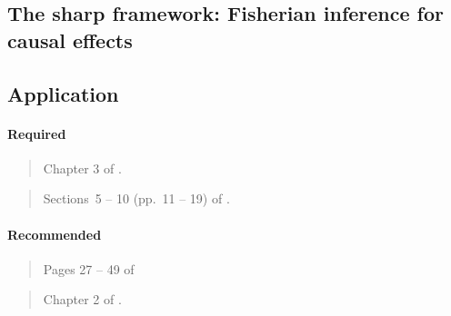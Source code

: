 \documentclass[12pt]{article}
\begin{document}
\begin{verse}  \end{verse}

\begin{verse}  \end{verse}

\begin{verse}  \end{verse}

\subsection{The sharp framework: Fisherian inference for causal effects}

\subsection*{Application}

\begin{verse}  \end{verse}

\paragraph*{Required}

\begin{verse} Chapter 3 of . \end{verse}

\begin{verse} Sections~5 -- 10 (pp.~11 -- 19) of . \end{verse}

\paragraph*{Recommended}

\begin{verse} Pages 27 -- 49 of  \end{verse}

\begin{verse} Chapter 2 of . \end{verse}

\begin{verse}  \end{verse}

\begin{verse}  \end{verse}
\end{document}
